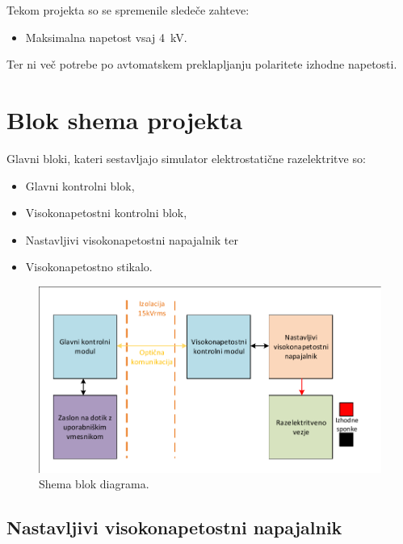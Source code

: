 \documentclass[a4paper,twoside,openright,12pt,slovene]{book}
\begin{document}
Tekom projekta so se spremenile sledeče zahteve:
\begin{itemize}
\item Maksimalna napetost vsaj \SI{4}{\kilo\volt}.
\end{itemize}
Ter ni več potrebe po avtomatskem preklapljanju polaritete izhodne napetosti.

\chapter{Blok shema projekta} \label{blokshemaprojekta}

Glavni bloki, kateri sestavljajo simulator elektrostatične razelektritve so:
\begin{itemize}
\item Glavni kontrolni blok,
\item Visokonapetostni kontrolni blok,
\item Nastavljivi visokonapetostni napajalnik ter
\item Visokonapetostno stikalo.
\end{itemize}

\begin{figure}[h]
    \centering
    \includegraphics[width=1\columnwidth]{Sheme/Osnovna blok shema poenostavljena.pdf}
    \caption{\label{BlokDiagramShema} Shema blok diagrama.}
\end{figure}



\section{Nastavljivi visokonapetostni napajalnik}
\end{document}
